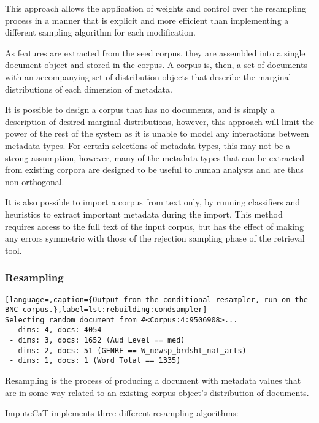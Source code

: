 This approach allows the application of weights and control over the resampling process in a manner that is explicit and more efficient than implementing a different sampling algorithm for each modification.

As features are extracted from the seed corpus, they are assembled into a single document object and stored in the corpus.  A corpus is, then, a set of documents with an accompanying set of distribution objects that describe the marginal distributions of each dimension of metadata.

It is possible to design a corpus that has no documents, and is simply a description of desired marginal distributions, however, this approach will limit the power of the rest of the system as it is unable to model any interactions between metadata types.  For certain selections of metadata types, this may not be a strong assumption, however, many of the metadata types that can be extracted from existing corpora are designed to be useful to human analysts and are thus non-orthogonal.

It is also possible to import a corpus from text only, by running classifiers and heuristics to extract important metadata during the import.  This method requires access to the full text of the input corpus, but has the effect of making any errors symmetric with those of the rejection sampling phase of the retrieval tool.


\subsubsection{Resampling}
\label{sec:rebuilding:method:retrieval:resampling}

\begin{lstlisting}[language=,caption={Output from the conditional resampler, run on the BNC corpus.},label=lst:rebuilding:condsampler]
Selecting random document from #<Corpus:4:9506908>...
 - dims: 4, docs: 4054
 - dims: 3, docs: 1652 (Aud Level == med)
 - dims: 2, docs: 51 (GENRE == W_newsp_brdsht_nat_arts)
 - dims: 1, docs: 1 (Word Total == 1335)
\end{lstlisting}

Resampling is the process of producing a document with metadata values that are in some way related to an existing corpus object's distribution of documents.

ImputeCaT implements three different resampling algorithms:

